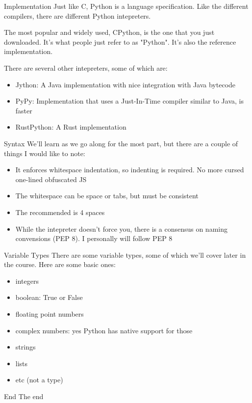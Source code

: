 \documentclass[10pt]{beamer}
\begin{document}
\begin{frame}{Implementation}
    Just like C, Python is a language specification. Like the different compilers, there are different Python intepreters.

    The most popular and widely used, CPython, is the one that you just downloaded. It's what people just refer to as "Python". It's also the reference implementation.

    There are several other intepreters, some of which are:
    \begin{itemize}
        \item Jython: A Java implementation with nice integration with Java bytecode
        \item PyPy: Implementation that uses a Just-In-Time compiler similar to Java, is faster
        \item RustPython: A Rust implementation
    \end{itemize}
\end{frame}

\begin{frame}{Syntax}
    We'll learn as we go along for the most part, but there are a couple of things I would like to note:
    \begin{itemize}
        \item It enforces whitespace indentation, so indenting is required. No more cursed one-lined obfuscated JS
        \item The whitespace can be space or tabs, but must be consistent
        \item The recommended is 4 spaces
        \item While the intepreter doesn't force you, there is a consensus on naming convensions (PEP 8). I personally will follow PEP 8
    \end{itemize}
\end{frame}

\begin{frame}{Variable Types}
    There are some variable types, some of which we'll cover later in the course. Here are some basic ones:
    \begin{itemize}
        \item integers
        \item boolean: True or False
        \item floating point numbers
        \item complex numbers: yes Python has native support for those
        \item strings
        \item lists
        \item etc (not a type)
    \end{itemize}
\end{frame}

\begin{frame}[standout]{End}
  The end
\end{frame}
\end{document}
